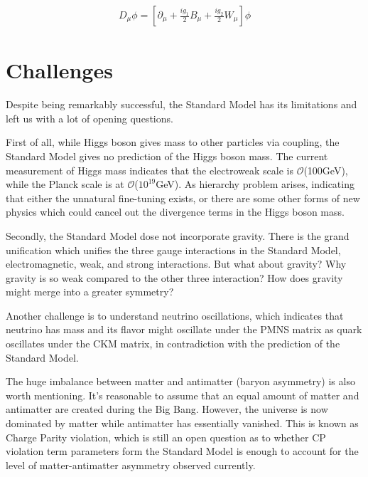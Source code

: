 \begin{equation}
  \begin{aligned}
  D_{\mu}\phi = [\partial_{\mu}+\frac{ig_{1}}{2}B_{\mu}+\frac{ig_{2}}{2}W_{\mu}]\phi
  \end{aligned}
  \label{eq:c1Standard Modelldh}
\end{equation}

\section{Challenges}
\par Despite being remarkably successful, the Standard Model has its limitations and left us with a lot of opening questions.

\par First of all, while Higgs boson gives mass to other particles via coupling, the Standard Model gives no prediction of the Higgs boson mass. The current measurement of Higgs mass indicates that the electroweak scale is $\mathcal{O}$(100GeV), while the Planck scale is at $\mathcal{O}$($10^{19}$GeV). As hierarchy problem arises, indicating that either the unnatural fine-tuning exists, or there are some other forms of new physics which could cancel out the divergence terms in the Higgs boson mass.

\par Secondly, the Standard Model dose not incorporate gravity. There is the grand unification which unifies the three gauge interactions in the Standard Model, electromagnetic, weak, and strong interactions. But what about gravity? Why gravity is so weak compared to the other three interaction? How does gravity might merge into a greater symmetry?

\par Another challenge is to understand neutrino oscillations, which indicates that neutrino has mass and its flavor might oscillate under the PMNS matrix as quark oscillates under the CKM matrix, in contradiction with the prediction of the Standard Model.

\par The huge imbalance between matter and antimatter (baryon asymmetry) is also worth mentioning. It's reasonable to assume that an equal amount of matter and antimatter are created during the Big Bang. However, the universe is now dominated by matter while antimatter has essentially vanished. This is known as Charge Parity violation, which is still an open question as to whether CP violation term parameters form the Standard Model is enough to account for the level of matter-antimatter asymmetry observed currently.

